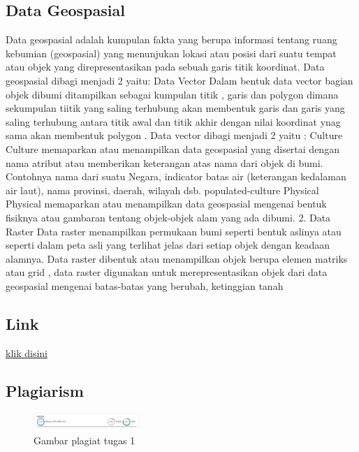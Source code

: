 \subsection{Data Geospasial}
Data geospasial adalah kumpulan fakta yang berupa informasi tentang ruang kebumian (geospasial) yang menunjukan lokasi atau posisi dari suatu tempat atau objek yang direpresentasikan pada sebuah garis titik koordinat. Data geospasial dibagi menjadi 2 yaitu:
Data Vector
Dalam bentuk data vector bagian objek dibumi ditampilkan sebagai kumpulan titik , garis dan polygon dimana sekumpulan tiitik yang saling terhubung akan membentuk garis dan garis yang saling terhubung antara titik awal dan titik akhir dengan nilai koordinat ynag sama akan membentuk polygon . Data vector dibagi menjadi 2 yaitu :
Culture
Culture memaparkan atau menampilkan data geospasial yang disertai dengan nama atribut atau memberikan keterangan atas nama dari objek di bumi. Contohnya nama dari suatu Negara, indicator batas air (keterangan kedalaman air laut), nama provinsi, daerah, wilayah dsb.
populated-culture
Physical
Physical memaparkan atau menampilkan data geospasial mengenai bentuk fisiknya atau gambaran tentang objek-objek alam yang ada dibumi.
2. Data Raster
Data raster menampilkan permukaan bumi seperti bentuk aslinya atau seperti dalam peta asli yang terlihat jelas dari setiap objek dengan keadaan alamnya. Data raster dibentuk atau menampilkan objek berupa elemen matriks atau grid , data raster digunakan untuk merepresentasikan objek dari data geospasial mengenai batas-batas yang berubah, ketinggian tanah

\subsection{Link}
\href{https://youtu.be/GYiF4K6OzEg}{klik disini}

\subsection{Plagiarism}
\begin{figure}[H]
	\includegraphics[width=4cm]{figures/1174005/ONI.JPG}
	\centering
	\caption{Gambar plagiat tugas 1}
\end{figure}
